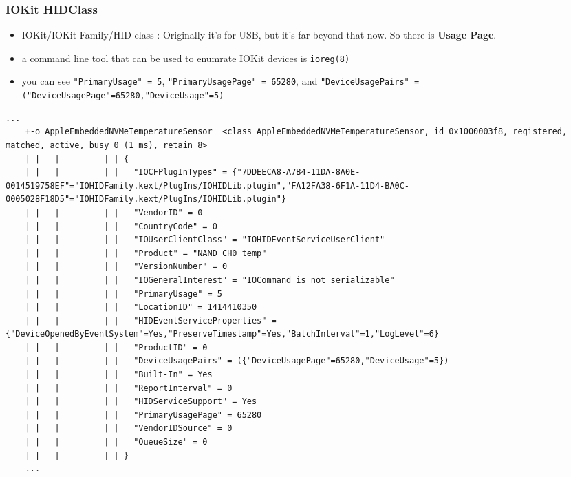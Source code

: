 \documentclass{beamer}
\begin{document}
\begin{frame}
  \frametitle{IOKit HIDClass}
  \begin{itemize}
  \item IOKit/IOKit Family/HID class \cite{iokit:family}: Originally it's for USB, but it's far beyond that now. So there is \textbf{Usage Page}.
  \item a command line tool that can be used to enumrate IOKit devices is \texttt{ioreg(8)}
  \item you can see \texttt{"PrimaryUsage" = 5}, \texttt{"PrimaryUsagePage" = 65280}, and \texttt{"DeviceUsagePairs" = ({"DeviceUsagePage"=65280,"DeviceUsage"=5})}
  \end{itemize}
  
  \begin{adjustbox}{width=\textwidth,keepaspectratio}
    \begin{lstlisting}[caption={Example TemperatureSensor in \texttt{ioreg} output}]
    ...
    +-o AppleEmbeddedNVMeTemperatureSensor  <class AppleEmbeddedNVMeTemperatureSensor, id 0x1000003f8, registered, matched, active, busy 0 (1 ms), retain 8>
    | |   |         | | {
    | |   |         | |   "IOCFPlugInTypes" = {"7DDEECA8-A7B4-11DA-8A0E-0014519758EF"="IOHIDFamily.kext/PlugIns/IOHIDLib.plugin","FA12FA38-6F1A-11D4-BA0C-0005028F18D5"="IOHIDFamily.kext/PlugIns/IOHIDLib.plugin"}
    | |   |         | |   "VendorID" = 0
    | |   |         | |   "CountryCode" = 0
    | |   |         | |   "IOUserClientClass" = "IOHIDEventServiceUserClient"
    | |   |         | |   "Product" = "NAND CH0 temp"
    | |   |         | |   "VersionNumber" = 0
    | |   |         | |   "IOGeneralInterest" = "IOCommand is not serializable"
    | |   |         | |   "PrimaryUsage" = 5
    | |   |         | |   "LocationID" = 1414410350
    | |   |         | |   "HIDEventServiceProperties" = {"DeviceOpenedByEventSystem"=Yes,"PreserveTimestamp"=Yes,"BatchInterval"=1,"LogLevel"=6}
    | |   |         | |   "ProductID" = 0
    | |   |         | |   "DeviceUsagePairs" = ({"DeviceUsagePage"=65280,"DeviceUsage"=5})
    | |   |         | |   "Built-In" = Yes
    | |   |         | |   "ReportInterval" = 0
    | |   |         | |   "HIDServiceSupport" = Yes
    | |   |         | |   "PrimaryUsagePage" = 65280
    | |   |         | |   "VendorIDSource" = 0
    | |   |         | |   "QueueSize" = 0
    | |   |         | | }
    ...
    \end{lstlisting}
  \end{adjustbox}

\end{frame}
\end{document}
